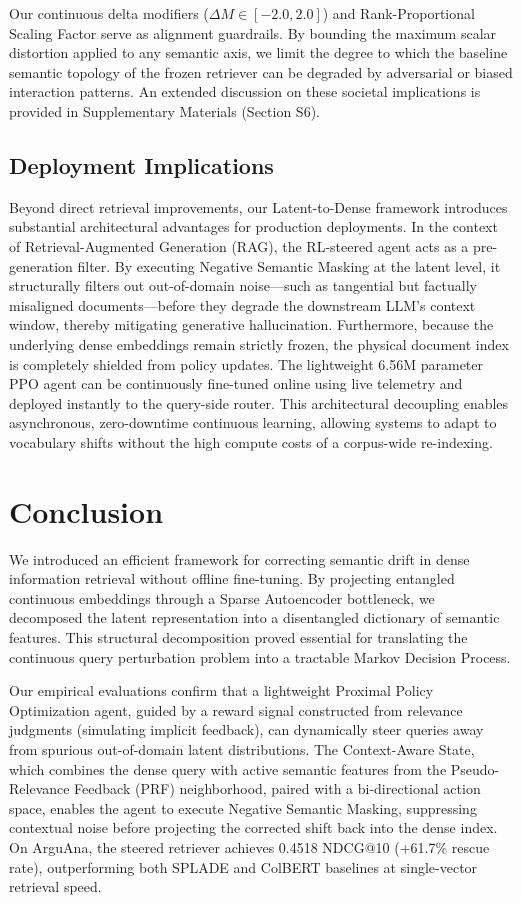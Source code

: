 \documentclass[sigconf]{acmart}
\begin{document}
Our continuous delta modifiers ($\Delta M \in [-2.0, 2.0]$) and Rank-Proportional Scaling Factor serve as alignment guardrails. By bounding the maximum scalar distortion applied to any semantic axis, we limit the degree to which the baseline semantic topology of the frozen retriever can be degraded by adversarial or biased interaction patterns. An extended discussion on these societal implications is provided in Supplementary Materials (Section S6).

\subsection{Deployment Implications}

Beyond direct retrieval improvements, our Latent-to-Dense framework introduces substantial architectural advantages for production deployments. In the context of Retrieval-Augmented Generation (RAG), the RL-steered agent acts as a pre-generation filter. By executing Negative Semantic Masking at the latent level, it structurally filters out out-of-domain noise---such as tangential but factually misaligned documents---before they degrade the downstream LLM's context window, thereby mitigating generative hallucination. Furthermore, because the underlying dense embeddings remain strictly frozen, the physical document index is completely shielded from policy updates. The lightweight 6.56M parameter PPO agent can be continuously fine-tuned online using live telemetry and deployed instantly to the query-side router. This architectural decoupling enables asynchronous, zero-downtime continuous learning, allowing systems to adapt to vocabulary shifts without the high compute costs of a corpus-wide re-indexing.

\section{Conclusion}

We introduced an efficient framework for correcting semantic drift in dense information retrieval without offline fine-tuning. By projecting entangled continuous embeddings through a Sparse Autoencoder bottleneck, we decomposed the latent representation into a disentangled dictionary of semantic features. This structural decomposition proved essential for translating the continuous query perturbation problem into a tractable Markov Decision Process.

Our empirical evaluations confirm that a lightweight Proximal Policy Optimization agent, guided by a reward signal constructed from relevance judgments (simulating implicit feedback), can dynamically steer queries away from spurious out-of-domain latent distributions. The Context-Aware State, which combines the dense query with active semantic features from the Pseudo-Relevance Feedback (PRF) neighborhood, paired with a bi-directional action space, enables the agent to execute Negative Semantic Masking, suppressing contextual noise before projecting the corrected shift back into the dense index. On ArguAna, the steered retriever achieves 0.4518 NDCG@10 (+61.7\% rescue rate), outperforming both SPLADE and ColBERT baselines at single-vector retrieval speed.
\end{document}
